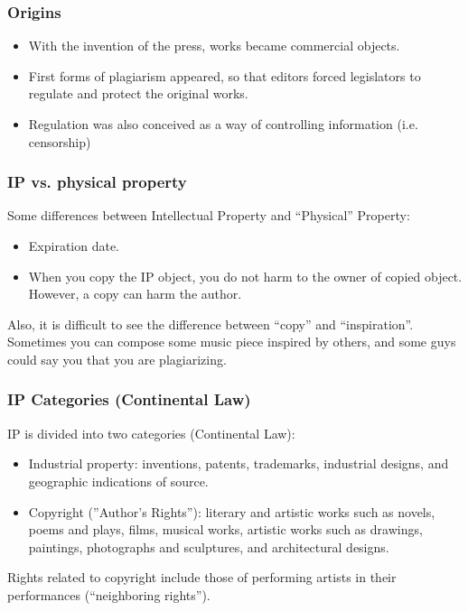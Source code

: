 
\begin{frame}
\frametitle{Origins}

\begin{itemize}
\item With the invention of the press, works became commercial objects.
\item First forms of plagiarism appeared, so that editors forced legislators
to regulate and protect the original works.
\item Regulation was also conceived as a way of controlling information (i.e.
censorship)
\end{itemize}


\end{frame}


\begin{frame}
\frametitle{IP vs. physical property}

Some differences between Intellectual Property and ``Physical''
Property:
\begin{itemize}
\item Expiration date.
\item When you copy the IP object, you do not harm to the owner of
  copied object. However, a copy can harm the author.
\end{itemize}

Also, it is difficult to see the difference between ``copy'' and
``inspiration''. Sometimes you can compose some music piece inspired
by others, and some guys could say you that you are plagiarizing.


\end{frame}




\begin{frame}
\frametitle{IP Categories (Continental Law)}

IP is divided into two categories (Continental Law):  

\begin{itemize}
\item \alert{Industrial property}: inventions, patents, trademarks, industrial designs, and geographic indications of source. 
\item \alert{Copyright} (''Author's Rights''): literary and artistic works such as novels, poems and plays, films, musical works, artistic works such as drawings, paintings, photographs and sculptures, and architectural designs.  
\end{itemize}

Rights related to copyright include those of performing artists in their performances (``neighboring rights'').  

\end{frame}


